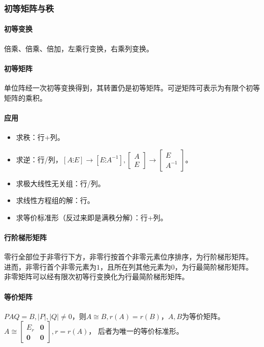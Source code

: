 \documentclass[
12pt, %
a4paper, 
oneside, %
headinclude,footinclude, %
]{scrartcl}
\begin{document}
\subsubsection{初等矩阵与秩}
\paragraph{初等变换}
倍乘、倍乘、倍加，左乘行变换，右乘列变换。
\paragraph{初等矩阵}
单位阵经一次初等变换得到，其转置仍是初等矩阵。可逆矩阵可表示为有限个初等矩阵的乘积。
\paragraph{应用}
\begin{itemize}
\item 求秩：行+列。
\item 求逆：行/列，$ [A \vdots E] \rightarrow [E \vdots A^{-1}], \begin{bmatrix} A \\ E \end{bmatrix} \rightarrow \begin{bmatrix} E \\ A^{-1} \end{bmatrix} $。
\item 求极大线性无关组：行/列。
\item 求线性方程组的解：行。
\item 求等价标准形（反过来即是满秩分解）：行+列。
\end{itemize}
\paragraph{行阶梯形矩阵}
零行全部位于非零行下方，非零行按首个非零元素位序排序，为行阶梯形矩阵。
进而，非零行首个非零元素为$ 1 $，且所在列其他元素为$ 0 $，为行最简阶梯形矩阵。
非零矩阵可以经有限次初等行变换化为行最简阶梯形矩阵。
\paragraph{等价矩阵}
$ PAQ = B, |P|,|Q| \neq 0 $，则$ A \cong B, r(A) = r(B) $，$ A,B $为等价矩阵。
$ A \cong \begin{bmatrix} E_r & \mathbf{0} \\ \mathbf{0} & \mathbf{0} \end{bmatrix}, r = r(A) $，
后者为唯一的等价标准形。
\end{document}
